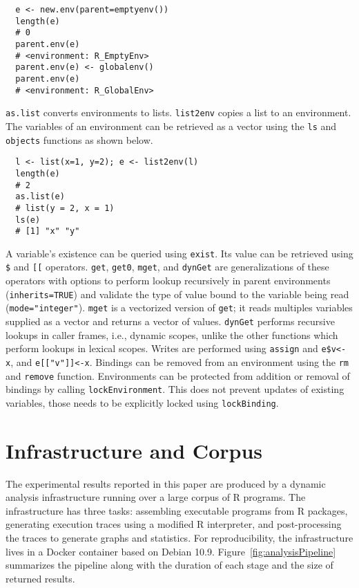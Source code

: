 \documentclass[10pt,sigplan,authorversion=true]{acmart}
\renewcommand{\c}[1]{\lstinline |#1|\xspace}
\newcommand{\asList}{\c{as.list}}
\newcommand{\listToEnv}{\c{list2env}}
\newcommand{\ls}{\c{ls}}
\newcommand{\objects}{\c{objects}}
\newcommand{\subDollar}{\c{$}}
\newcommand{\subBracket}{\c{[[}}
\newcommand{\exist}{\c{exist}}
\newcommand{\get}{\c{get}}
\newcommand{\getZero}{\c{get0}}
\newcommand{\mget}{\c{mget}}
\newcommand{\dynGet}{\c{dynGet}}
\newcommand{\assign}{\c{assign}}
\newcommand{\remove}{\c{remove}}
\renewcommand{\rm}{\c{rm}}
\newcommand{\lockEnvironment}{\c{lockEnvironment}}
\newcommand{\lockBinding}{\c{lockBinding}}
\begin{document}
\begin{lstlisting}
  e <- new.env(parent=emptyenv())
  length(e)
  # 0
  parent.env(e)
  # <environment: R_EmptyEnv>
  parent.env(e) <- globalenv()
  parent.env(e)
  # <environment: R_GlobalEnv>
\end{lstlisting}

\noindent
\asList converts environments to lists. \listToEnv copies a list to an
environment. The variables of an environment can be retrieved as a vector using
the \ls and \objects functions as shown below.

\begin{lstlisting}
  l <- list(x=1, y=2); e <- list2env(l)
  length(e)
  # 2
  as.list(e)
  # list(y = 2, x = 1)
  ls(e)
  # [1] "x" "y"
\end{lstlisting}

\noindent
A variable's existence can be queried using \exist. Its value can be retrieved
using \subDollar and \subBracket operators. \get, \getZero, \mget, and \dynGet
are generalizations of these operators with options to perform lookup
recursively in parent environments (\c{inherits=TRUE}) and validate the type of
value bound to the variable being read (\c{mode="integer"}). \mget is a
vectorized version of \get; it reads multiples variables supplied as a vector
and returns a vector of values. \dynGet performs recursive lookups in caller
frames, i.e., dynamic scopes, unlike the other functions which perform lookups
in lexical scopes. Writes are performed using \assign and \c{e$v<-x}, and
\c{e[["v"]]<-x}. Bindings can be removed from an environment using the \rm and
\remove function.
Environments can be protected from addition or removal of bindings by calling
\lockEnvironment. This does not prevent updates of existing variables, those
needs to be explicitly locked using \lockBinding.


\section{Infrastructure and Corpus}

The experimental results reported in this paper are produced by a dynamic
analysis infrastructure running over a large corpus of R programs. The
infrastructure has three tasks: assembling executable programs from R packages,
generating execution traces using a modified R interpreter, and post-processing
the traces to generate graphs and statistics. For reproducibility, the
infrastructure lives in a Docker container based on Debian 10.9.
Figure~\ref{fig:analysisPipeline} summarizes the pipeline along with the
duration of each stage and the size of returned results.
\end{document}
